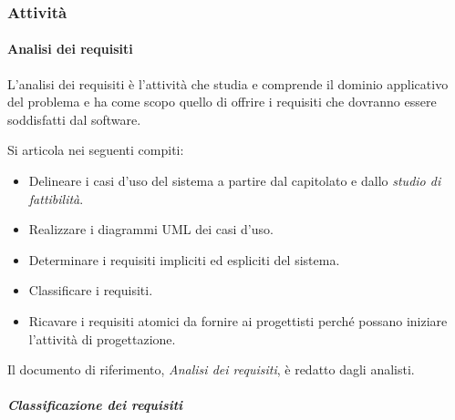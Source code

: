 \documentclass[../norme-di-progetto.tex]{subfiles}
\begin{document}
\subsubsection{Attività}%
\label{subs:sviluppo/attivita}

\paragraph{Analisi dei requisiti}%
\label{par:analisi_dei_requisiti}
L'analisi dei requisiti è l'attività che studia e comprende il dominio applicativo del problema e ha come scopo quello di offrire i requisiti che dovranno essere soddisfatti dal software.

Si articola nei seguenti compiti:

\begin{itemize}
  \item Delineare i casi d'uso del sistema a partire dal capitolato e dallo \textit{studio di fattibilità}.
  \item Realizzare i diagrammi UML dei casi d'uso.
  \item Determinare i requisiti impliciti ed espliciti del sistema.
  \item Classificare i requisiti.
  \item Ricavare i requisiti atomici da fornire ai progettisti perché possano iniziare l'attività di progettazione.
\end{itemize}

Il documento di riferimento, \textit{Analisi dei requisiti}, è redatto dagli analisti.

\subparagraph{Classificazione dei requisiti}%
\label{subp:classificazione_dei_requisiti}
\end{document}
